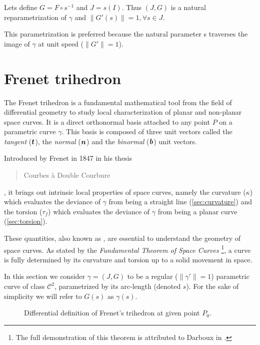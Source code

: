 Lets define $G=F\circ s^{-1}$ and $J=s(I)$. Thus $(J,G)$ is a natural reparametrization of $\gamma$ and  $\|G'(s)\| = 1, \forall s \in J$.

This parametrization is preferred because the natural parameter s traverses the image of $\gamma$ at unit speed ($\|G'\| = 1$).



\section{Frenet trihedron}\label{sec:frenettrihedron}
The Frenet trihedron is a fundamental mathematical tool from the field of differential geometry to study local characterization of planar and non-planar space curves. It is a direct orthonormal basis attached to any point $P$ on a parametric curve $\gamma$. This basis is composed of three unit vectors called the \emph{tangent} ($\boldsymbol{t}$), the \emph{normal} ($\boldsymbol{n}$) and the \emph{binormal} ($\boldsymbol{b}$) unit vectors.

Introduced by Frenet in 1847 in his thesis \blockcquote[]{Frenet1852}{Courbes à Double Courbure}, it brings out intrinsic local properties of space curves, namely the curvature ($\kappa$) which evaluates the deviance of $\gamma$ from being a straight line (\cref{sec:curvature}) and the torsion ($\tau_f$) which evaluates the deviance of $\gamma$ from being a planar curve (\cref{sec:torsion}).

These quantities, also known as , are essential to understand the geometry of space curves. As stated by the \emph{Fundamental Theorem of Space Curves} \footnote{The full demonstration of this theorem is attributed to Darboux in \cite[p.11]{Delcourt2007}.}, a curve is fully determined by its curvature and torsion up to a solid movement in space.

In this section we consider $\gamma=(J,G)$ to be a regular ($\|\gamma'\|=1$) parametric curve of class ${\mathcal{C}}^{2}$, parametrized by its arc-length (denoted $s$). For the sake of simplicity we will refer to $G(s)$ as $\gamma(s)$.

\begin{figure}[t]
     \centering
     \caption{Differential definition of Frenet's trihedron at given point $P_0$.}
     \label{fig:3_1}
\end{figure}

